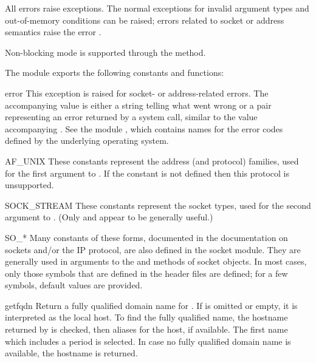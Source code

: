 All errors raise exceptions.  The normal exceptions for invalid
argument types and out-of-memory conditions can be raised; errors
related to socket or address semantics raise the error
.

Non-blocking mode is supported through the
 method.

The module  exports the following constants and functions:


\begin{excdesc}{error}
This exception is raised for socket- or address-related errors.
The accompanying value is either a string telling what went wrong or a
pair 
representing an error returned by a system
call, similar to the value accompanying .
See the module , which contains
names for the error codes defined by the underlying operating system.
\end{excdesc}

\begin{datadesc}{AF_UNIX}
These constants represent the address (and protocol) families,
used for the first argument to .  If the
 constant is not defined then this protocol is
unsupported.
\end{datadesc}

\begin{datadesc}{SOCK_STREAM}
These constants represent the socket types,
used for the second argument to .
(Only  and
 appear to be generally useful.)
\end{datadesc}

\begin{datadesc}{SO_*}
Many constants of these forms, documented in the \UNIX{} documentation on
sockets and/or the IP protocol, are also defined in the socket module.
They are generally used in arguments to the  and
 methods of socket objects.  In most cases, only
those symbols that are defined in the \UNIX{} header files are defined;
for a few symbols, default values are provided.
\end{datadesc}

\begin{funcdesc}{getfqdn}{}
Return a fully qualified domain name for .
If  is omitted or empty, it is interpreted as the local
host.  To find the fully qualified name, the hostname returned by
 is checked, then aliases for the host, if
available.  The first name which includes a period is selected.  In
case no fully qualified domain name is available, the hostname is
returned.
\end{funcdesc}

